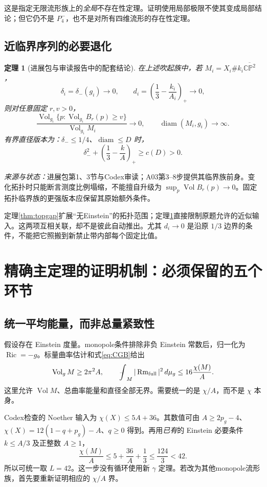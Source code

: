 \documentclass[UTF8,a4paper,11pt,fontset=fandol]{ctexart}
\numberwithin{equation}{section}
\newtheorem{theorem}{定理}[section]
\theoremstyle{definition}
\newcommand{\Ric}{\operatorname{Ric}}
\newcommand{\Rm}{\operatorname{Rm}}
\newcommand{\Vol}{\operatorname{Vol}}
\newcommand{\diam}{\operatorname{diam}}
\newcommand{\CP}{\mathbb{CP}}
\newcommand{\dd}{\,d\mu_g}
\newcommand{\fint}{\mathop{\rlap{\,\raisebox{0.1ex}{\tiny$-$}}\int}\nolimits}
\newcommand{\source}[1]{\par\noindent\textit{来源与状态：}#1\par}
\begin{document}
这是指定无限流形族上的\emph{全局}不存在性定理。证明使用局部极限不使其变成局部结论；但它仍不是 $P_4^-$，也不是对所有四维流形的存在性定理。

\subsection{近临界序列的必要退化}
\begin{theorem}[进展包与审读报告中的配套结论]\label{thm:collapse}
在上述吹起族中，若 $M_i=X_i\#k_i\overline{\CP^2}$，
\[
\delta_i=\delta_-(g_i)\longrightarrow0,
\qquad d_i=\left(\frac13-\frac{k_i}{A_i}\right)_+\longrightarrow0,
\]
则对任意固定 $r,v>0$，
\begin{equation}\label{eq:measurecollapse}
\frac{\Vol_{g_i}\{p:\Vol_{g_i}B_r(p)\ge v\}}
{\Vol_{g_i}M_i}\longrightarrow0,
\qquad \diam(M_i,g_i)\longrightarrow\infty.
\end{equation}
有界直径版本为：$\delta_-\le1/4$、$\diam\le D$ 时，
\begin{equation}\label{eq:diambound}
\delta_-^2+\left(\frac13-\frac{k}{A}\right)_+\ge c(D)>0.
\end{equation}
\end{theorem}
\source{进展包第1、3节与Codex审读；A03第3--8步提供其临界族前身。变化拓扑时只能断言测度比例塌缩，不能擅自升级为 $\sup_p\Vol B_r(p)\to0$。固定拓扑临界族的更强版本应保留其原始额外条件。}

定理\ref{thm:topgap}扩展“无Einstein”的拓扑范围；定理\ref{thm:collapse}直接限制原题允许的近似输入。这两项互相关联，却不是彼此自动推出。尤其 $d_i\to0$ 是沿原 $1/3$ 边界的条件，不能把它照搬到新禁止带内部每个固定比值。

\section{精确主定理的证明机制：必须保留的五个环节}
\subsection{统一平均能量，而非总量紧致性}
假设存在 Einstein 度量。monopole条件排除非负 Einstein 常数后，归一化为 $\Ric=-g$。标量曲率估计和式\eqref{eq:CGB}给出
\begin{equation}\label{eq:budget}
 \Vol_gM\ge2\pi^2A,
 \qquad \fint_M|\Rm_{\rm full}|^2\dd
 \le16\frac{\chi(M)}A.
\end{equation}
这里允许 $\Vol M$、总曲率能量和直径全部无界。需要统一的是 $\chi/A$，而不是 $\chi$ 本身。

Codex检查的 Noether 输入为 $\chi(X)\le5A+36$。其数值可由 $A\ge2p_g-4$、$\chi(X)=12(1-q+p_g)-A$、$q\ge0$ 得到。再用\emph{已有}的 Einstein 必要条件 $k\le A/3$ 及正整数 $A\ge1$，
\begin{equation}
 \frac{\chi(M)}A\le5+\frac{36}A+\frac13\le\frac{124}3<42.
\end{equation}
所以可统一取 $L=42$。这一步没有循环使用新 $\gamma$ 定理。若改为其他monopole流形族，首先要重新证明相应的 $\chi/A$ 界。
\end{document}

